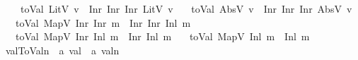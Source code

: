 \begin{isabellebody}
\ \ \ \ {\isachardoublequoteopen}toVal{}{}{}{}\ {\isacharparenleft}{\kern0pt}LitV\ v{\isacharparenright}{\kern0pt}\ {\isacharequal}{\kern0pt}\ {\isacharparenleft}{\kern0pt}Inr\ {\isacharparenleft}{\kern0pt}Inr\ {\isacharparenleft}{\kern0pt}Inr\ {\isacharparenleft}{\kern0pt}LitV{}\ v{\isacharparenright}{\kern0pt}{\isacharparenright}{\kern0pt}{\isacharparenright}{\kern0pt}{\isacharparenright}{\kern0pt}{\isachardoublequoteclose}\isanewline
\ \ {\isacharbar}{\kern0pt}\ {\isachardoublequoteopen}toVal{}{}{}{}\ {\isacharparenleft}{\kern0pt}AbsV\ v{\isacharparenright}{\kern0pt}\ {\isacharequal}{\kern0pt}\ {\isacharparenleft}{\kern0pt}Inr\ {\isacharparenleft}{\kern0pt}Inr\ {\isacharparenleft}{\kern0pt}Inr\ {\isacharparenleft}{\kern0pt}AbsV{}\ v{\isacharparenright}{\kern0pt}{\isacharparenright}{\kern0pt}{\isacharparenright}{\kern0pt}{\isacharparenright}{\kern0pt}{\isachardoublequoteclose}\isanewline
\ \ {\isacharbar}{\kern0pt}\ {\isachardoublequoteopen}toVal{}{}{}{}\ {\isacharparenleft}{\kern0pt}MapV\ {\isacharparenleft}{\kern0pt}Inr\ {\isacharparenleft}{\kern0pt}Inr\ m{\isacharparenright}{\kern0pt}{\isacharparenright}{\kern0pt}{\isacharparenright}{\kern0pt}\ {\isacharequal}{\kern0pt}\ {\isacharparenleft}{\kern0pt}Inr\ {\isacharparenleft}{\kern0pt}Inr\ {\isacharparenleft}{\kern0pt}Inl\ m{\isacharparenright}{\kern0pt}{\isacharparenright}{\kern0pt}{\isacharparenright}{\kern0pt}{\isachardoublequoteclose}\isanewline
\ \ {\isacharbar}{\kern0pt}\ {\isachardoublequoteopen}toVal{}{}{}{}\ {\isacharparenleft}{\kern0pt}MapV\ {\isacharparenleft}{\kern0pt}Inr\ {\isacharparenleft}{\kern0pt}Inl\ m{\isacharparenright}{\kern0pt}{\isacharparenright}{\kern0pt}{\isacharparenright}{\kern0pt}\ {\isacharequal}{\kern0pt}\ {\isacharparenleft}{\kern0pt}Inr\ {\isacharparenleft}{\kern0pt}Inl\ m{\isacharparenright}{\kern0pt}{\isacharparenright}{\kern0pt}{\isachardoublequoteclose}\isanewline
\ \ {\isacharbar}{\kern0pt}\ {\isachardoublequoteopen}toVal{}{}{}{}\ {\isacharparenleft}{\kern0pt}MapV\ {\isacharparenleft}{\kern0pt}Inl\ m{\isacharparenright}{\kern0pt}{\isacharparenright}{\kern0pt}\ {\isacharequal}{\kern0pt}\ {\isacharparenleft}{\kern0pt}Inl\ m{\isacharparenright}{\kern0pt}{\isachardoublequoteclose}\isanewline
\isanewline
{}\isamarkupfalse%
\ val{}ToValn\ {\isacharcolon}{\kern0pt}{\isacharcolon}{\kern0pt}\ {\isachardoublequoteopen}{\isacharprime}{\kern0pt}a\ val{}{}{}{}\ {\isasymRightarrow}\ {\isacharprime}{\kern0pt}a\ valn{\isachardoublequoteclose}\ \isanewline

\end{isabellebody}
